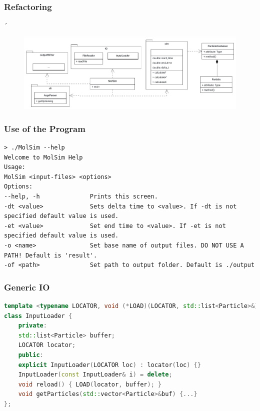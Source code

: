 
\begin{frame}
\frametitle{Refactoring}
\vspace{-0.5cm}
´\begin{figure}
	\centering
	\includegraphics[height=0.5\textheight]{./UMLClassDiagram-1}
	\label{fig:umlclassdiagram-1}
\end{figure}
\end{frame}

\begin{frame}[fragile]
	\frametitle{Use of the Program}
	\vspace{0.7cm}
	\begin{Verbatim}
> ./MolSim --help
Welcome to MolSim Help
Usage:
MolSim <input-files> <options>
Options:
--help, -h              Prints this screen.
-dt <value>             Sets delta time to <value>. If -dt is not specified default value is used.
-et <value>             Set end time to <value>. If -et is not specified default value is used.
-o <name>               Set base name of output files. DO NOT USE A PATH! Default is 'result'.
-of <path>              Set path to output folder. Default is ./output
	\end{Verbatim}
\end{frame}

\begin{frame}[fragile]
\frametitle{Generic IO}
\vspace{0.7cm}
\begin{lstlisting}[language=C++]
template <typename LOCATOR, void (*LOAD)(LOCATOR, std::list<Particle>&)>
class InputLoader {
	private:
	std::list<Particle> buffer;
	LOCATOR locator;
	public:
	explicit InputLoader(LOCATOR loc) : locator(loc) {}
	InputLoader(const InputLoader& i) = delete;
	void reload() { LOAD(locator, buffer); }
	void getParticles(std::vector<Particle>&buf) {...}
};
\end{lstlisting}
\end{frame}

